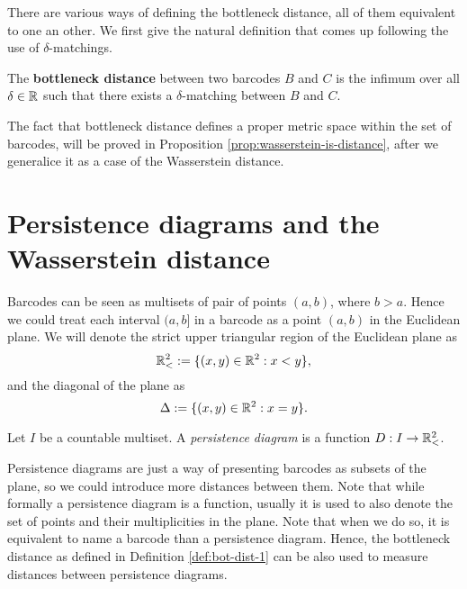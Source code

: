 There are various ways of defining the bottleneck distance, all of them equivalent to one an other. We first give the natural definition that comes up following the use of $\delta$-matchings.

\begin{definition} \label{def:bot-dist-1}
    The {\bf bottleneck distance} between two barcodes $ B $ and $ C $ is the infimum over all $ \delta \in \mathbb R $ such that there exists a $\delta$-matching between $ B $ and $ C $.
\end{definition}

The fact that bottleneck distance defines a proper metric space within the set of barcodes, will be proved in Proposition \ref{prop:wasserstein-is-distance}, after we generalice it as a case of the Wasserstein distance.

\section{Persistence diagrams and the Wasserstein distance} \label{sec:preliminaries-wp-persistance}

Barcodes can be seen as multisets of pair of points $ (a, b) $, where $ b > a $. Hence we could treat each interval $ (a, b] $ in a barcode as a point $ (a, b) $ in the Euclidean plane. We will denote the strict upper triangular region of the Euclidean plane as
\begin{equation}
   \mathbb{R}_<^2 := \{(x, y) \in \mathbb R^2 : x < y\}, 
\end{equation}
and the diagonal of the plane as
\begin{equation}
    \Delta := \{(x, y) \in \mathbb R^2 : x = y\}.
\end{equation}

\begin{definition}
    Let $ I $ be a countable multiset. A {\it persistence diagram} is a function $ D: I \to \mathbb{R}_<^2 $.
\end{definition}

Persistence diagrams are just a way of presenting barcodes as subsets of the plane, so we could introduce more distances between them. Note that while formally a persistence diagram is a function, usually it is used to also denote the set of points and their multiplicities in the plane. Note that when we do so, it is equivalent to name a barcode than a persistence diagram. Hence, the bottleneck distance as defined in Definition \ref{def:bot-dist-1} can be also used to measure distances between persistence diagrams.

